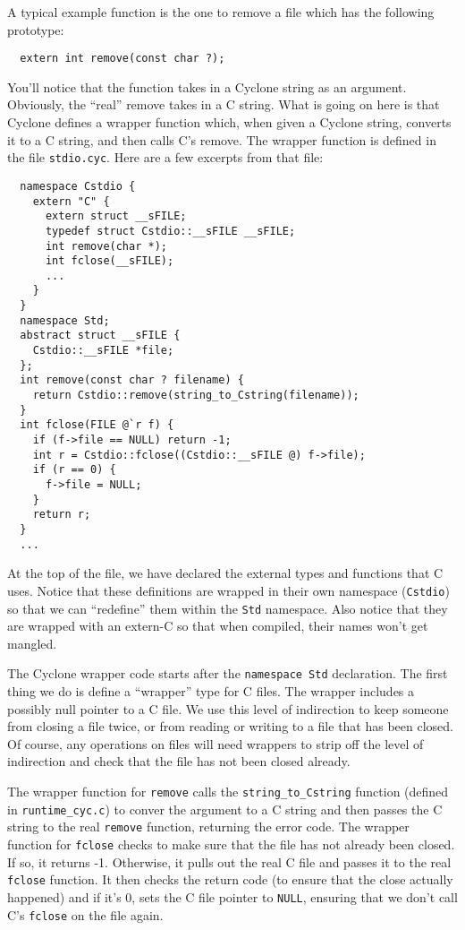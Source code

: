 A typical example function is the one to remove a file which
has the following prototype:
\begin{verbatim}
  extern int remove(const char ?);
\end{verbatim}

You'll notice that the function takes in a Cyclone string
as an argument.  Obviously, the ``real'' remove takes in a
C string.  What is going on here is that Cyclone defines
a wrapper function which, when given a Cyclone string,
converts it to a C string, and then calls C's remove. 
The wrapper function is defined in the file \texttt{stdio.cyc}.
Here are a few excerpts from that file:
\begin{verbatim}
  namespace Cstdio {
    extern "C" {
      extern struct __sFILE;
      typedef struct Cstdio::__sFILE __sFILE;
      int remove(char *);
      int fclose(__sFILE);
      ...
    }
  }
  namespace Std;
  abstract struct __sFILE {
    Cstdio::__sFILE *file; 
  };
  int remove(const char ? filename) {
    return Cstdio::remove(string_to_Cstring(filename));
  }
  int fclose(FILE @`r f) {
    if (f->file == NULL) return -1;
    int r = Cstdio::fclose((Cstdio::__sFILE @) f->file);
    if (r == 0) {
      f->file = NULL;
    }
    return r;
  }
  ...
\end{verbatim}

At the top of the file, we have declared the external types
and functions that C uses.  Notice that these definitions
are wrapped in their own namespace (\texttt{Cstdio}) so that
we can ``redefine'' them within the \texttt{Std} namespace.
Also notice that they are wrapped with an extern-C so that
when compiled, their names won't get mangled.

The Cyclone wrapper code starts after the \texttt{namespace Std}
declaration.  The first thing we do is define a ``wrapper''
type for C files.  The wrapper includes a possibly null pointer
to a C file.  We use this level of indirection to keep someone
from closing a file twice, or from reading or writing to a file
that has been closed.  Of course, any operations on files will
need wrappers to strip off the level of indirection and check
that the file has not been closed already.  

The wrapper function for \texttt{remove} calls the \texttt{string\_to\_Cstring}
function (defined in \texttt{runtime\_cyc.c}) to conver the
argument to a C string and then passes the C string to the
real \texttt{remove} function, returning the error code.
The wrapper function for \texttt{fclose} checks to make sure that
the file has not already been closed.  If so, it returns -1.
Otherwise, it pulls out the real C file and passes it to the
real \texttt{fclose} function.  It then checks the return code
(to ensure that the close actually happened) and if it's 0,
sets the C file pointer to \texttt{NULL}, ensuring that we
don't call C's \texttt{fclose} on the file again.
